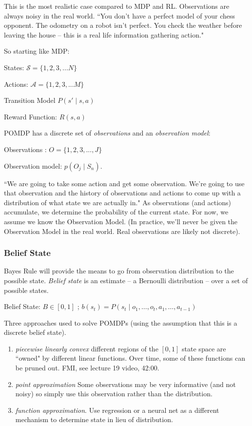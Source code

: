 \documentclass[11pt, oneside]{article}   	%
\begin{document}
This is the most realistic case compared to MDP and RL. Observations are always noisy in the real world. ``You don't have a perfect model of your chess opponent. The odometry on a robot isn't perfect. You check the weather before leaving the house -- this is a real life information gathering action."

So starting like MDP:

States: $\mathcal{S} = \{1,2,3,...N\}$

Actions: $\mathcal{A} = \{1,2,3,...M\}$ 

Transition Model $P(s'\mid s,a)$

Reward Function: $R(s,a)$

POMDP has a discrete set of \emph{observations} and an \emph{observation model}:

Observations : $O = \{1, 2, 3, ... , J\}$

Observation model: $p(O_j \mid S_n)$.

``We are going to take some action and get some observation. We're going to use that observation and the history of observations and actions to come up with a distribution of what state we are actually in." As observations (and actions) accumulate, we determine the probability of the current state. For now, we assume we know the Observation Model. (In practice, we'll never be given the Observation Model in the real world. Real observations are likely not discrete).

\subsubsection{Belief State}

Bayes Rule will provide the means to go from observation distribution to the possible state. \emph{Belief state} is an estimate -- a Bernoulli distribution -- over a set of possible states.

Belief State: $B \in [0, 1]$ ; $b(s_t) = P(s_t \mid o_1, \hdots , o_t,a_1, \hdots , a_{t-1})$

Three approaches used to solve POMDPs (using the assumption that this is a discrete belief state). 
\begin{enumerate}
	\item \emph{piecewise linearly convex} different regions of the $[0,1]$ state space are ``owned" by different linear functions.  Over time, some of these functions can be pruned out. FMI, see lecture 19 video, 42:00. 
	\item \emph{point approximation} Some observations may be very informative (and not noisy) so simply use this observation rather than the distribution.
	\item \emph{function approximation}. Use regression or a neural net as a different mechanism to determine state in lieu of distribution.
\end{enumerate}
\end{document}
